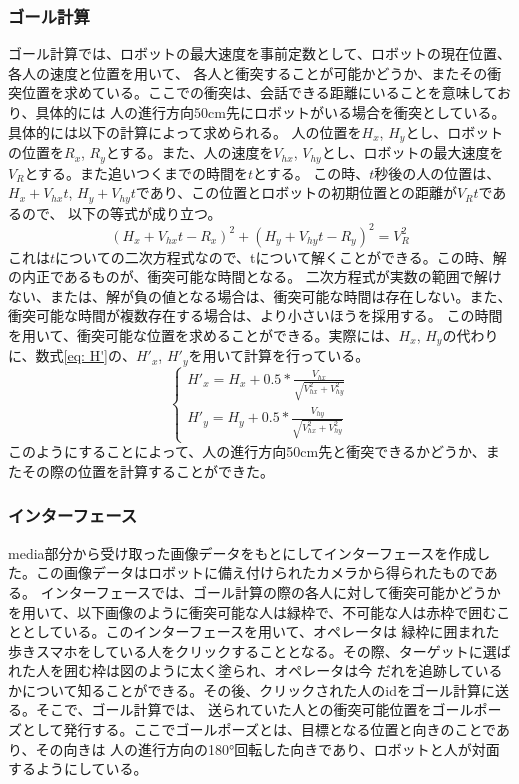 \documentclass[11pt,a4j]{jreport}
\begin{document}
\subsubsection{ゴール計算}
ゴール計算では、ロボットの最大速度を事前定数として、ロボットの現在位置、各人の速度と位置を用いて、
各人と衝突することが可能かどうか、またその衝突位置を求めている。ここでの衝突は、会話できる距離にいることを意味しており、具体的には
人の進行方向50cm先にロボットがいる場合を衝突としている。具体的には以下の計算によって求められる。
人の位置を$H_x$, $H_y$とし、ロボットの位置を$R_x$, $R_y$とする。また、人の速度を$V_{hx}$, $V_{hy}$とし、ロボットの最大速度を$V_R$とする。また追いつくまでの時間を$t$とする。
この時、$t$秒後の人の位置は、$H_x + V_{hx}t$, $H_y + V_{hy}t$であり、この位置とロボットの初期位置との距離が$V_Rt$であるので、
以下の等式が成り立つ。\begin{equation}(H_x + V_{hx}t - R_x)^{2} + (H_y + V_{hy}t - R_y)^2 = V_R^2\end{equation}
これは$t$についての二次方程式なので、tについて解くことができる。この時、解の内正であるものが、衝突可能な時間となる。
二次方程式が実数の範囲で解けない、または、解が負の値となる場合は、衝突可能な時間は存在しない。また、衝突可能な時間が複数存在する場合は、より小さいほうを採用する。
この時間を用いて、衝突可能な位置を求めることができる。実際には、$H_x$, $H_y$の代わりに、数式\ref{eq: H'}の、$H'_x$, $H'_y$を用いて計算を行っている。
\begin{equation}
  \label{eq: H'}
\left\{\begin{array}{l}
H'_x = H_x + 0.5*\frac{V_{hx}}{\sqrt{{V_{hx}^2 + V_{hy}^2}}}\\
H'_y = H_y + 0.5 * \frac{V_{hy}}{\sqrt{V_{hx}^2 + V_{hy}^2}}
\end{array}\right.
\end{equation}
このようにすることによって、人の進行方向50cm先と衝突できるかどうか、またその際の位置を計算することができた。

\subsubsection{インターフェース}
media部分から受け取った画像データをもとにしてインターフェースを作成した。この画像データはロボットに備え付けられたカメラから得られたものである。
インターフェースでは、ゴール計算の際の各人に対して衝突可能かどうかを用いて、以下画像のように衝突可能な人は緑枠で、不可能な人は赤枠で囲むこととしている。このインターフェースを用いて、オペレータは
緑枠に囲まれた歩きスマホをしている人をクリックすることとなる。その際、ターゲットに選ばれた人を囲む枠は図のように太く塗られ、オペレータは今
だれを追跡しているかについて知ることができる。その後、クリックされた人のidをゴール計算に送る。そこで、ゴール計算では、
送られていた人との衝突可能位置をゴールポーズとして発行する。ここでゴールポーズとは、目標となる位置と向きのことであり、その向きは
人の進行方向の180°回転した向きであり、ロボットと人が対面するようにしている。
\end{document}
